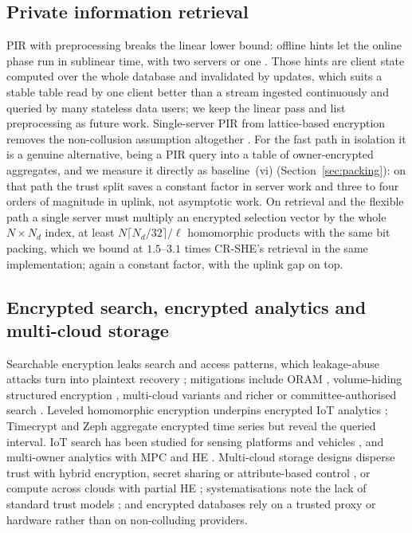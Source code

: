 \documentclass[a4paper,fleqn]{cas-sc}
\begin{document}
\subsection{Private information retrieval}
PIR with preprocessing breaks the linear lower bound: offline hints let the
online phase run in sublinear time, with two servers
\citep{corrigan2020private} or one \citep{corrigan2022single,zhou2024piano}.
Those hints are client state computed over the whole database and invalidated
by updates, which suits a stable table read by one client better than a stream
ingested continuously and queried by many stateless data users; we keep the
linear pass and list preprocessing as future work. Single-server PIR from
lattice-based encryption
\citep{angel2018pir,mughees2021onionpir,menon2022spiral,davidson2023frodopir}
removes the non-collusion assumption altogether
\citep{kushilevitz1997replication}. For the fast path in isolation it is a
genuine alternative, being a PIR query into a table of owner-encrypted
aggregates, and we measure it directly as baseline~(vi)
(Section~\ref{sec:packing}): on that path the trust split saves a constant
factor in server work and three to four orders of magnitude in uplink, not
asymptotic work. On retrieval and the flexible path a single server must
multiply an encrypted selection vector by the whole $N\times N_d$ index, at
least $N\lceil N_d/32\rceil/\ell$ homomorphic products with the same bit
packing, which we bound at $1.5$--$3.1$ times CR-SHE's retrieval in the same
implementation; again a constant factor, with the uplink gap on top.

\subsection{Encrypted search, encrypted analytics and multi-cloud storage}
Searchable encryption leaks search and access patterns, which leakage-abuse
attacks turn into plaintext recovery
\citep{islam2012access,cash2015leakage,grubbs2017leakage}; mitigations include
ORAM \citep{goldreich1996software}, volume-hiding structured encryption
\citep{kamara2019computationally,patel2019mitigating}, multi-cloud variants
\citep{xu2021privacy,xu2023symmetric} and richer or committee-authorised
search \citep{zhang2024secure,yang2023dynamic,du2022lightweight}. Leveled
homomorphic encryption \citep{fan2012somewhat,cryptoeprint:2016/421} underpins
encrypted IoT analytics \citep{halder2022enabling,kamble2024homomorphic};
Timecrypt \citep{timecrypt} and Zeph \citep{zeph} aggregate encrypted time
series but reveal the queried interval. IoT search has been studied for sensing
platforms \citep{xu2019achieving} and vehicles \citep{wu2024distributed}, and
multi-owner analytics with MPC and HE \citep{verma2025secure}. Multi-cloud
storage designs disperse trust with hybrid encryption, secret sharing or
attribute-based control \citep{bharot2025cloudlock,muthuvel2026design}, or
compute across clouds with partial HE \citep{wang2020shamc}; systematisations
note the lack of standard trust models \citep{cryptoeprint:2026/207}; and
encrypted databases \citep{poddar2019arx,crooks2018obladi,dauterman2021snoopy}
rely on a trusted proxy or hardware rather than on non-colluding providers.
\end{document}
